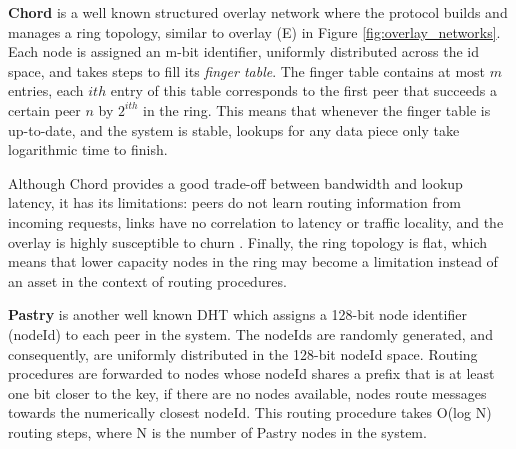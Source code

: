 \textbf{Chord} \cite{stoica2003chord} is a well known structured overlay network where the protocol builds and manages a ring topology, similar to overlay (E) in Figure \ref{fig:overlay_networks}. Each node is assigned an m-bit identifier, uniformly distributed across the id space, and takes steps to fill its \textit{finger table}. The finger table contains at most \(m\) entries, each $ith$ entry of this table corresponds to the first peer that succeeds a certain peer \(n\) by \(2^{ith}\) in the ring. This means that whenever the finger table is up-to-date, and the system is stable, lookups for any data piece only take logarithmic time to finish. 

Although Chord provides a good trade-off between bandwidth and lookup latency, it has its limitations: peers do not learn routing information from incoming requests, links have no correlation to latency or traffic locality, and the overlay is highly susceptible to churn \cite{dht_performance_churn}. Finally, the ring topology is flat, which means that lower capacity nodes in the ring may become a limitation instead of an asset in the context of routing procedures.




\textbf{Pastry} \cite{rowstron2001pastry} is another well known DHT which assigns a 128-bit node identifier (nodeId) to each peer in the system. The nodeIds are randomly generated, and consequently, are uniformly distributed in the 128-bit nodeId space. Routing procedures are forwarded to nodes whose nodeId shares a prefix that is at least one bit closer to the key, if there are no nodes available, nodes route messages towards the numerically closest nodeId. This routing procedure takes O(log N) routing steps, where N is the number of Pastry nodes in the system. 

